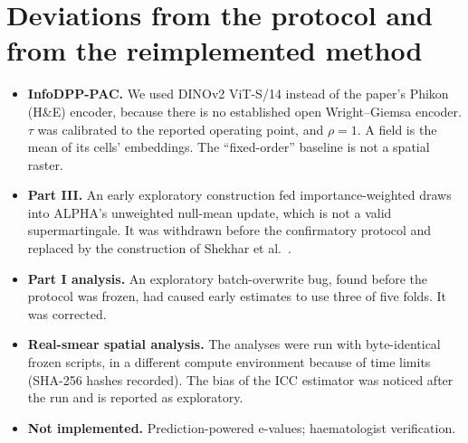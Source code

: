 \documentclass[11pt]{article}
\theoremstyle{remark}
\theoremstyle{definition}
\begin{document}
\section{Deviations from the protocol and from the reimplemented method}\label{app:dev}
\begin{itemize}
\item \textbf{InfoDPP-PAC.} We used DINOv2 ViT-S/14 instead of the paper's Phikon (H\&E) encoder, because there is no established open Wright--Giemsa encoder. $\tau$ was calibrated to the reported operating point, and $\rho=1$. A field is the mean of its cells' embeddings. The ``fixed-order'' baseline is not a spatial raster.
\item \textbf{Part III.} An early exploratory construction fed importance-weighted draws into ALPHA's unweighted null-mean update, which is not a valid supermartingale. It was withdrawn before the confirmatory protocol and replaced by the construction of Shekhar et al.\ \cite{shekhar2023rlfa}.
\item \textbf{Part I analysis.} An exploratory batch-overwrite bug, found before the protocol was frozen, had caused early estimates to use three of five folds. It was corrected.
\item \textbf{Real-smear spatial analysis.} The analyses were run with byte-identical frozen scripts, in a different compute environment because of time limits (SHA-256 hashes recorded). The bias of the ICC estimator was noticed after the run and is reported as exploratory.
\item \textbf{Not implemented.} Prediction-powered e-values; haematologist verification.
\end{itemize}
\end{document}
